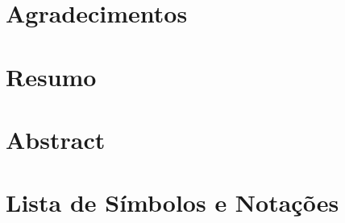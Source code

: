 

	
	

	\newpage

	

	\newpage

	

	\chapter*{Agradecimentos}
	

	\chapter*{Resumo}%
	
	\thispagestyle{empty}
	\newpage

	\chapter*{Abstract}%
	
	\thispagestyle{empty}
	\newpage


	\listoffigures 	
	\newpage

	\listoftables 
	\thispagestyle{empty}
	\newpage

	\chapter*{Lista de Símbolos e Notações}
	
	\thispagestyle{empty}
	\newpage

	\tableofcontents 
	\thispagestyle{empty}
	\newpage


